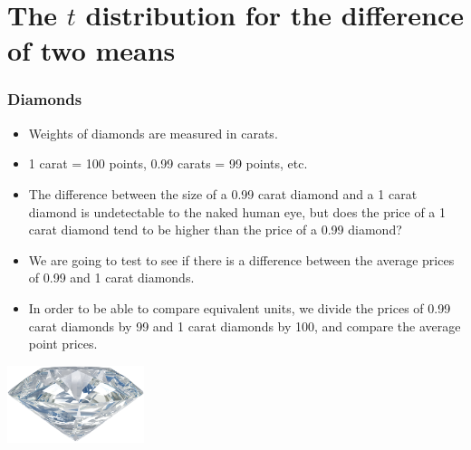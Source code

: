 
\section{The $t$ distribution for the difference of two means}


\begin{frame}
\frametitle{Diamonds}

\begin{itemize}

\item Weights of diamonds are measured in carats. 

\item 1 carat = 100 points, 0.99 carats = 99 points, etc.

\item The difference between the size of a 0.99 carat diamond and a 1 carat diamond is undetectable to the naked human eye, but does the price of a 1 carat diamond tend to be higher than the price of a 0.99 diamond?

\item We are going to test to see if there is a difference between the average prices of 0.99 and 1 carat diamonds.

\item In order to be able to compare equivalent units, we divide the prices of 0.99 carat diamonds by 99 and 1 carat diamonds by 100, and compare the average point prices.

\end{itemize}

\hfill \includegraphics[width=0.3\textwidth]{5-4_two_t/figures/diamonds/diamond}

\end{frame}


